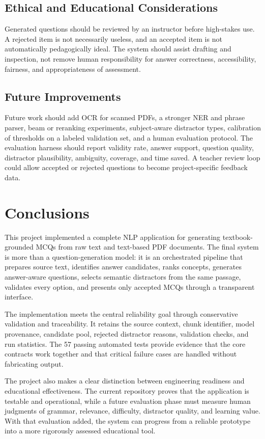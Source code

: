 \documentclass[12pt,a4paper]{report}
\begin{document}
\section{Ethical and Educational Considerations}
Generated questions should be reviewed by an instructor before high-stakes use. A rejected item is not necessarily useless, and an accepted item is not automatically pedagogically ideal. The system should assist drafting and inspection, not remove human responsibility for answer correctness, accessibility, fairness, and appropriateness of assessment.

\section{Future Improvements}
Future work should add OCR for scanned PDFs, a stronger NER and phrase parser, beam or reranking experiments, subject-aware distractor types, calibration of thresholds on a labeled validation set, and a human evaluation protocol. The evaluation harness should report validity rate, answer support, question quality, distractor plausibility, ambiguity, coverage, and time saved. A teacher review loop could allow accepted or rejected questions to become project-specific feedback data.

\clearpage
\chapter{Conclusions}
This project implemented a complete NLP application for generating textbook-grounded MCQs from raw text and text-based PDF documents. The final system is more than a question-generation model: it is an orchestrated pipeline that prepares source text, identifies answer candidates, ranks concepts, generates answer-aware questions, selects semantic distractors from the same passage, validates every option, and presents only accepted MCQs through a transparent interface.

The implementation meets the central reliability goal through conservative validation and traceability. It retains the source context, chunk identifier, model provenance, candidate pool, rejected distractor reasons, validation checks, and run statistics. The 57 passing automated tests provide evidence that the core contracts work together and that critical failure cases are handled without fabricating output.

The project also makes a clear distinction between engineering readiness and educational effectiveness. The current repository proves that the application is testable and operational, while a future evaluation phase must measure human judgments of grammar, relevance, difficulty, distractor quality, and learning value. With that evaluation added, the system can progress from a reliable prototype into a more rigorously assessed educational tool.
\end{document}
